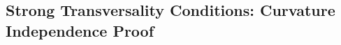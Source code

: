 \documentclass[a4paper,12pt]{extarticle}
\theoremstyle{definition}
\begin{document}











\subsection{Strong Transversality Conditions: Curvature Independence Proof}
\end{document}
